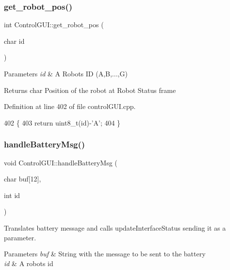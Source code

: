 \subsubsection{\texorpdfstring{get\+\_\+robot\+\_\+pos()}{get\_robot\_pos()}}
{\footnotesize\ttfamily int Control\+G\+U\+I\+::get\+\_\+robot\+\_\+pos (\begin{DoxyParamCaption}\item[{char}]{id }\end{DoxyParamCaption})}


\begin{DoxyParams}{Parameters}
{\em id} & A Robot\textquotesingle{}s ID (A,B,...,G) \\
\hline
\end{DoxyParams}
\begin{DoxyReturn}{Returns}
char Position of the robot at Robot Status frame 
\end{DoxyReturn}


Definition at line 402 of file control\+G\+U\+I.\+cpp.


\begin{DoxyCode}
402                                      \{
403     \textcolor{keywordflow}{return} uint8\_t(\textcolor{keywordtype}{id})-\textcolor{charliteral}{'A'};
404 \}
\end{DoxyCode}
\mbox{\label{class_control_g_u_i_a87c4112af79ad3a26de882717621d226}} 
\subsubsection{\texorpdfstring{handle\+Battery\+Msg()}{handleBatteryMsg()}}
{\footnotesize\ttfamily void Control\+G\+U\+I\+::handle\+Battery\+Msg (\begin{DoxyParamCaption}\item[{char}]{buf\mbox{[}12\mbox{]},  }\item[{int}]{id }\end{DoxyParamCaption})}



Translates battery message and calls update\+Interface\+Status sending it as a parameter. 


\begin{DoxyParams}{Parameters}
{\em buf} & String with the message to be sent to the battery \\
\hline
{\em id} & A robot\textquotesingle{}s id \\
\hline
\end{DoxyParams}


